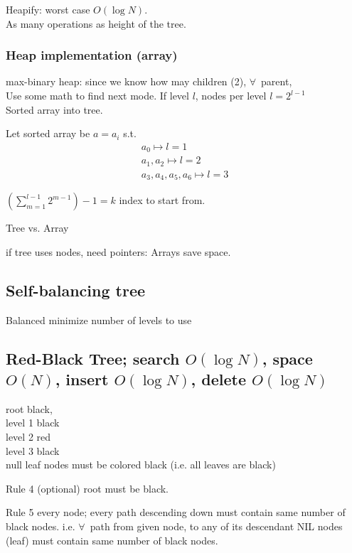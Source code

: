 \documentclass[10pt]{amsart}
\begin{document}
\begin{multicols*}{2}
Heapify: worst case $O(\log{N})$. \\
As many operations as height of the tree.

\subsubsection{Heap implementation (array)}

max-binary heap: since we know how may children (2), $\forall \, $ parent, \\
Use some math to find next mode. If level $l$, nodes per level $l= 2^{l-1}$ \\
Sorted array into tree.

Let sorted array be $a=a_i$ s.t. 
\[
\begin{gathered} 
	a_0 \mapsto l = 1\\ 
a_1, a_2 \mapsto l = 2 \\ 
a_3, a_4, a_5, a_6 \mapsto l = 3 
\end{gathered} 
\]

$\left(\sum_{m=1}^{l-1} 2^{m-1} \right) - 1 = k$ index to start from. 

Tree vs. Array

if tree uses nodes, need pointers: Arrays save space. 

\subsection{Self-balancing tree}

Balanced minimize number of levels to use

\subsection{Red-Black Tree; search $O(\log{N})$, space $O(N)$, insert $O(\log{N})$, delete $O(\log{N})$ }

root black, \\
level 1 black \\
level 2 red \\
level 3 black \\

null leaf nodes must be colored black (i.e. all leaves are black)

Rule 4 (optional) root must be black.

Rule 5 every node; every path descending down must contain same number of black nodes. i.e. $\forall\, $ path from given node, to any of its descendant NIL nodes (leaf) must contain same number of black nodes. 


\end{multicols*}
\end{document}
